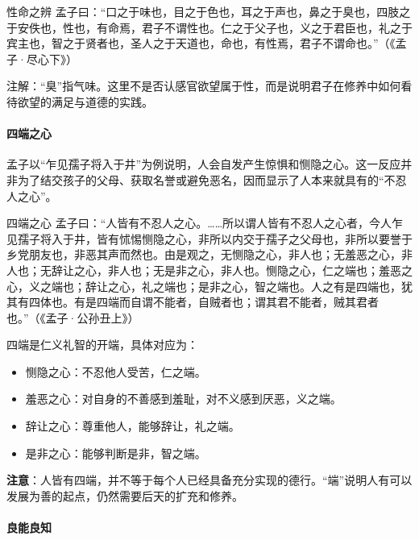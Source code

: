 \begin{fancybox}{性命之辨}
    孟子曰：“口之于味也，目之于色也，耳之于声也，鼻之于臭也，四肢之于安佚也，性也，有命焉，君子不谓性也。仁之于父子也，义之于君臣也，礼之于宾主也，智之于贤者也，圣人之于天道也，命也，有性焉，君子不谓命也。”（《孟子·尽心下》）
\end{fancybox}

注解：“臭”指气味。这里不是否认感官欲望属于性，而是说明君子在修养中如何看待欲望的满足与道德的实践。

\paragraph{四端之心}

孟子以“乍见孺子将入于井”为例说明，人会自发产生惊惧和恻隐之心。这一反应并非为了结交孩子的父母、获取名誉或避免恶名，因而显示了人本来就具有的“不忍人之心”。

\begin{fancybox}{四端之心}
    孟子曰：“人皆有不忍人之心。……所以谓人皆有不忍人之心者，今人乍见孺子将入于井，皆有怵惕恻隐之心，非所以内交于孺子之父母也，非所以要誉于乡党朋友也，非恶其声而然也。由是观之，无恻隐之心，非人也；无羞恶之心，非人也；无辞让之心，非人也；无是非之心，非人也。恻隐之心，仁之端也；羞恶之心，义之端也；辞让之心，礼之端也；是非之心，智之端也。人之有是四端也，犹其有四体也。有是四端而自谓不能者，自贼者也；谓其君不能者，贼其君者也。”（《孟子·公孙丑上》）
\end{fancybox}

四端是仁义礼智的开端，具体对应为：

\begin{itemize}
    \item 恻隐之心：不忍他人受苦，仁之端。
    \item 羞恶之心：对自身的不善感到羞耻，对不义感到厌恶，义之端。
    \item 辞让之心：尊重他人，能够辞让，礼之端。
    \item 是非之心：能够判断是非，智之端。
\end{itemize}

\textbf{注意}：人皆有四端，并不等于每个人已经具备充分实现的德行。“端”说明人有可以发展为善的起点，仍然需要后天的扩充和修养。

\paragraph{良能良知}

